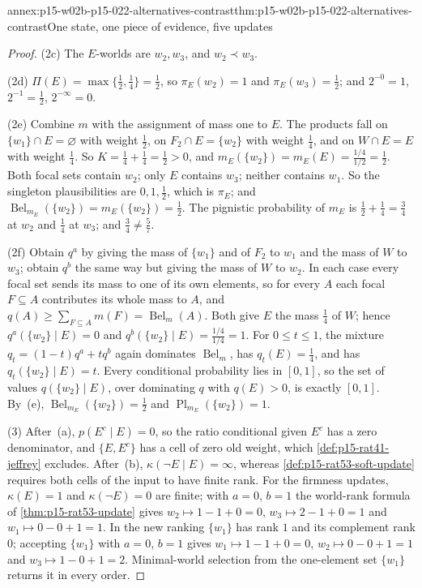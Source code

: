 \begin{annexitem}{annex:p15-w02b-p15-022-alternatives-contrast}{thm:p15-w02b-p15-022-alternatives-contrast}{One state, one piece of evidence, five updates}
\begin{proof}
(2c) The \(E\)-worlds are \(w_2,w_3\), and \(w_2\prec w_3\).

(2d) \(\Pi(E)=\max\{\tfrac12,\tfrac14\}=\tfrac12\), so
\(\pi_E(w_2)=1\) and \(\pi_E(w_3)=\tfrac12\); and
\(2^{-0}=1\), \(2^{-1}=\tfrac12\), \(2^{-\infty}=0\).

(2e) Combine \(m\) with the assignment of mass one to \(E\). The products
fall on \(\{w_1\}\cap E=\varnothing\) with weight \(\tfrac12\), on
\(F_2\cap E=\{w_2\}\) with weight \(\tfrac14\), and on \(W\cap E=E\) with
weight \(\tfrac14\). So \(K=\tfrac14+\tfrac14=\tfrac12>0\), and
\(m_E(\{w_2\})=m_E(E)=\tfrac{1/4}{1/2}=\tfrac12\). Both focal sets contain
\(w_2\); only \(E\) contains \(w_3\); neither contains \(w_1\). So the
singleton plausibilities are \(0,1,\tfrac12\), which is \(\pi_E\); and
\(\operatorname{Bel}_{m_E}(\{w_2\})=m_E(\{w_2\})=\tfrac12\). The pignistic
probability of \(m_E\) is \(\tfrac12+\tfrac14=\tfrac34\) at \(w_2\) and
\(\tfrac14\) at \(w_3\); and \(\tfrac34\neq\tfrac57\).

(2f) Obtain \(q^a\) by giving the mass of \(\{w_1\}\) and of \(F_2\) to
\(w_1\) and the mass of \(W\) to \(w_3\); obtain \(q^b\) the same way but
giving the mass of \(W\) to \(w_2\). In each case every focal set sends its
mass to one of its own elements, so for every \(A\) each focal
\(F\subseteq A\) contributes its whole mass to \(A\), and
\(q(A)\geq\sum_{F\subseteq A}m(F)=\operatorname{Bel}_m(A)\). Both give
\(E\) the mass \(\tfrac14\) of \(W\); hence \(q^a(\{w_2\}\mid E)=0\) and
\(q^b(\{w_2\}\mid E)=\tfrac{1/4}{1/4}=1\). For \(0\leq t\leq1\), the
mixture \(q_t=(1-t)q^a+tq^b\) again dominates \(\operatorname{Bel}_m\),
has \(q_t(E)=\tfrac14\), and has \(q_t(\{w_2\}\mid E)=t\). Every
conditional probability lies in \([0,1]\), so the set of values
\(q(\{w_2\}\mid E)\), over dominating \(q\) with \(q(E)>0\), is exactly
\([0,1]\). By~(e),
\(\operatorname{Bel}_{m_E}(\{w_2\})=\tfrac12\) and
\(\operatorname{Pl}_{m_E}(\{w_2\})=1\).

(3) After~(a), \(p(E^c\mid E)=0\), so the ratio conditional given \(E^c\)
has a zero denominator, and \(\{E,E^c\}\) has a cell of zero old weight,
which \cref{def:p15-rat41-jeffrey} excludes. After~(b),
\(\kappa(\neg E\mid E)=\infty\), whereas \cref{def:p15-rat53-soft-update}
requires both cells of the input to have finite rank. For the firmness
updates, \(\kappa(E)=1\) and \(\kappa(\neg E)=0\) are finite; with
\(a=0\), \(b=1\) the world-rank formula of \cref{thm:p15-rat53-update}
gives \(w_2\mapsto1-1+0=0\),
\(w_3\mapsto2-1+0=1\) and \(w_1\mapsto0-0+1=1\). In the new ranking
\(\{w_1\}\) has rank \(1\) and its complement rank \(0\); accepting
\(\{w_1\}\) with \(a=0\), \(b=1\) gives \(w_1\mapsto1-1+0=0\),
\(w_2\mapsto0-0+1=1\) and \(w_3\mapsto1-0+1=2\). Minimal-world selection
from the one-element set \(\{w_1\}\) returns it in every order.


\end{proof}
\end{annexitem}
